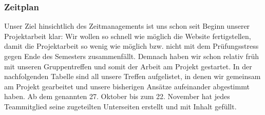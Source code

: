 \documentclass[12pt,a4paper]{article}
\begin{document}
\subsubsection{Zeitplan}
Unser Ziel hinsichtlich des Zeitmanagements ist uns schon seit Beginn unserer Projektarbeit klar: 
Wir wollen so schnell wie möglich die Website fertigstellen, damit die Projektarbeit so wenig wie möglich bzw. nicht mit dem Prüfungsstress gegen Ende des Semesters zusammenfällt.
Demnach haben wir schon relativ früh mit unseren Gruppentreffen und somit der Arbeit am Projekt gestartet. In der nachfolgenden Tabelle sind all unsere Treffen aufgelistet, in denen wir gemeinsam am Projekt gearbeitet und unsere bisherigen Ansätze aufeinander abgestimmt haben. Ab dem genannten 27. Oktober bis zum 22. November hat jedes Teammitglied seine zugeteilten Unterseiten erstellt und mit Inhalt gefüllt. \\
\end{document}
